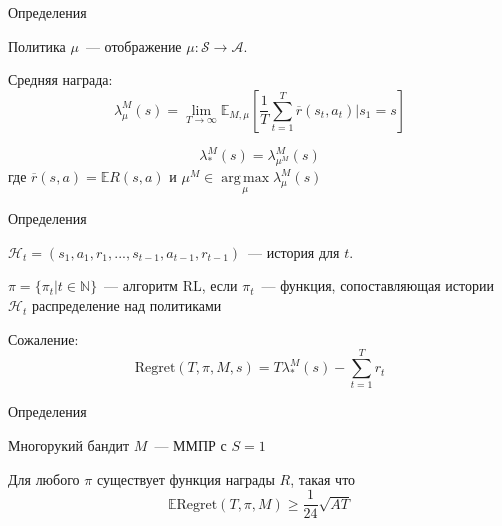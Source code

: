 \documentclass{beamer}
\DeclareMathOperator*{\argmax}{arg\,max}
\newcommand{\Hh}{\mathcal{H}}
\newcommand{\E}{\mathbb{E}}
\newcommand{\N}{\mathbb{N}}
\newcommand{\Reg}{\mbox{Regret}}
\newcommand{\Ss}{\mathcal{S}}
\newcommand{\A}{\mathcal{A}}
\begin{document}
\begin{frame}{Определения}


\begin{definition}
	
	Политика $\mu$~--- отображение $\mu\colon \Ss\to\A$.
\end{definition}

\begin{definition}
Средняя награда:
	$$\lambda_{\mu}^M(s)=\lim\limits_{T\to\infty}\E_{M,\mu}\left[\frac{1}{T}\sum\limits_{t=1}^T\overline{r}(s_t,a_t)\big|s_1=s\right]$$
	
	$$\lambda_*^M(s)=\lambda_{\mu^M}^M(s)$$
	где $\overline{r}(s,a)=\E R(s,a)$ и $\mu^M\in\argmax\limits_{\mu}\lambda^M_{\mu}(s)$ 
\end{definition}

\end{frame}

\begin{frame}{Определения}

\begin{definition}
$\Hh_t=(s_1,a_1,r_1,...,s_{t-1},a_{t-1},r_{t-1})$~--- история для $t$.
\end{definition}

\begin{definition}
$\pi=\{\pi_t\big|t\in\N\}$~--- алгоритм RL, если $\pi_t$~--- функция, сопоставляющая истории $\Hh_t$ распределение над политиками
	
\end{definition}

\begin{definition}
Сожаление:
	$$\Reg(T,\pi,M,s)=T\lambda_*^M(s)-\sum\limits_{t=1}^Tr_t$$
\end{definition}
\end{frame}

\begin{frame}{Определения}
	
\begin{definition}
	Многорукий бандит $M$~--- ММПР с $S=1$
\end{definition}

\begin{theorem}
	Для любого $\pi$ существует функция награды $R$, такая что
	$$\E\Reg(T,\pi,M)\geqslant \frac{1}{24}\sqrt{AT}$$
\end{theorem}
\end{frame}
\end{document}
